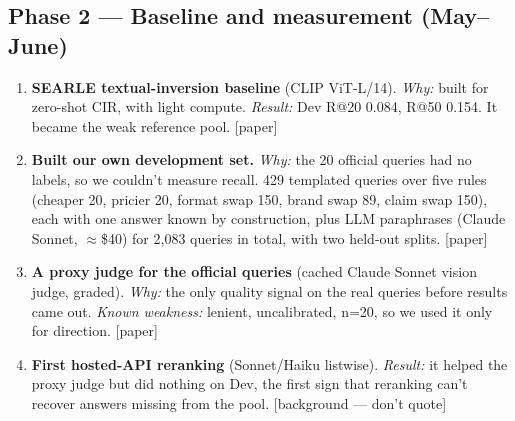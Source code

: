 \documentclass[11pt]{article}
\newcommand{\inpaper}{\textcolor{accent}{\small[paper]}}
\newcommand{\bg}{\textcolor{black!55}{\small[background --- don't quote]}}
\begin{document}
\subsection*{Phase 2 --- Baseline and measurement (May--June)}
\begin{enumerate}[resume,leftmargin=*]
  \item \textbf{SEARLE textual-inversion baseline} (CLIP ViT-L/14). \emph{Why:} built for
        zero-shot CIR, with light compute. \emph{Result:} Dev R@20 0.084, R@50 0.154. It
        became the weak reference pool. \inpaper
  \item \textbf{Built our own development set.} \emph{Why:} the 20 official queries had no
        labels, so we couldn't measure recall. 429 templated queries over five rules
        (cheaper 20, pricier 20, format swap 150, brand swap 89, claim swap 150), each with
        one answer known by construction, plus LLM paraphrases (Claude Sonnet,
        $\approx$\$40) for 2,083 queries in total, with two held-out splits. \inpaper
  \item \textbf{A proxy judge for the official queries} (cached Claude Sonnet vision judge,
        graded). \emph{Why:} the only quality signal on the real queries before results came
        out. \emph{Known weakness:} lenient, uncalibrated, n=20, so we used it only for
        direction. \inpaper
  \item \textbf{First hosted-API reranking} (Sonnet/Haiku listwise). \emph{Result:} it helped
        the proxy judge but did nothing on Dev, the first sign that reranking can't recover
        answers missing from the pool. \bg
\end{enumerate}
\end{document}
